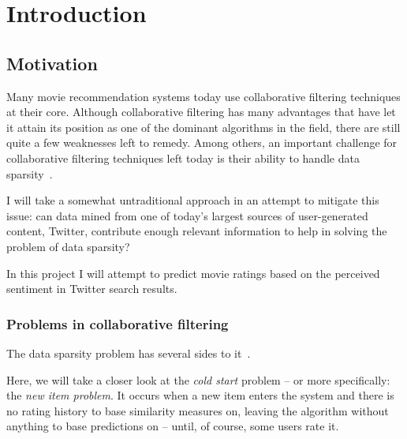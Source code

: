 
\chapter{Introduction} %

\label{Chapter1} %




\section{Motivation}
\label{sec:motivation}

Many movie recommendation systems today use collaborative filtering techniques at their core. Although collaborative filtering has many advantages that have let it attain its position as one of the dominant algorithms in the field, there are still quite a few weaknesses left to remedy. Among others, an important challenge for collaborative filtering techniques left today is their ability to handle data sparsity~\cite{Su:2009:SCF:1592474.1722966}.

I will take a somewhat untraditional approach in an attempt to mitigate this issue: can data mined from one of today's largest sources of user-generated content, Twitter, contribute enough relevant information to help in solving the problem of data sparsity?

In this project I will attempt to predict movie ratings based on the perceived sentiment in Twitter search results.

\subsection{Problems in collaborative filtering}

The data sparsity problem has several sides to it~\cite{Su:2009:SCF:1592474.1722966}.

Here, we will take a closer look at the \emph{cold start} problem -- or more specifically: the \emph{new item problem}. It occurs when a new item enters the system and there is no rating history to base similarity measures on, leaving the algorithm without anything to base predictions on -- until, of course, some users rate it.

